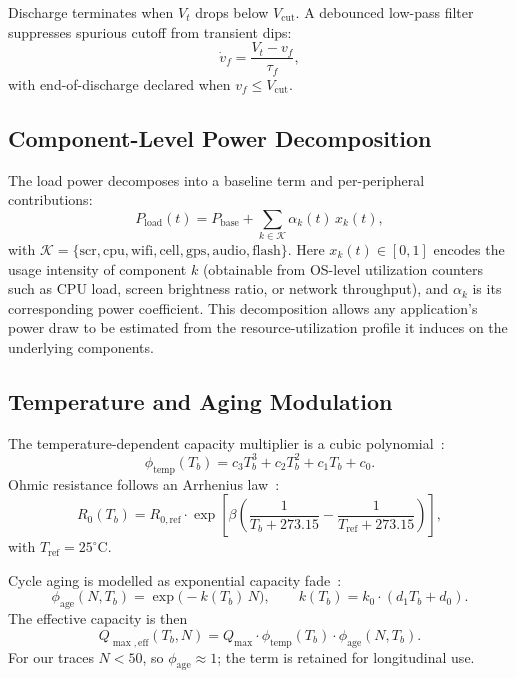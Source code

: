 \documentclass[conference]{IEEEtran}
\begin{document}
Discharge terminates when $V_t$ drops below $V_{\mathrm{cut}}$. A debounced low-pass filter suppresses spurious cutoff from transient dips:
\begin{equation}
    \dot{v}_f = \frac{V_t - v_f}{\tau_f},
    \label{eq:debounce}
\end{equation}
with end-of-discharge declared when $v_f \leq V_{\mathrm{cut}}$.

\subsection{Component-Level Power Decomposition}

The load power decomposes into a baseline term and per-peripheral contributions:
\begin{equation}
    P_{\mathrm{load}}(t) = P_{\mathrm{base}} + \sum_{k \in \mathcal{K}} \alpha_k(t)\,x_k(t),
    \label{eq:pload}
\end{equation}
with $\mathcal{K} = \{\mathrm{scr}, \mathrm{cpu}, \mathrm{wifi}, \mathrm{cell}, \mathrm{gps}, \mathrm{audio}, \mathrm{flash}\}$. Here $x_k(t) \in [0,1]$ encodes the usage intensity of component $k$ (obtainable from OS-level utilization counters such as CPU load, screen brightness ratio, or network throughput), and $\alpha_k$ is its corresponding power coefficient. This decomposition allows any application's power draw to be estimated from the resource-utilization profile it induces on the underlying components.

\subsection{Temperature and Aging Modulation}
\label{subsec:temp_aging}

The temperature-dependent capacity multiplier is a cubic polynomial~\cite{Bernardi_1985}:
\begin{equation}
    \phi_{\mathrm{temp}}(T_b) = c_3 T_b^3 + c_2 T_b^2 + c_1 T_b + c_0.
    \label{eq:phi_temp}
\end{equation}
Ohmic resistance follows an Arrhenius law~\cite{Arrhenius+1889+226+248}:
\begin{equation}
    R_0(T_b) = R_{0,\mathrm{ref}} \cdot \exp\!\left[\beta\left(\frac{1}{T_b + 273.15} - \frac{1}{T_{\mathrm{ref}} + 273.15}\right)\right],
    \label{eq:arrhenius}
\end{equation}
with $T_{\mathrm{ref}} = 25^{\circ}\mathrm{C}$.

Cycle aging is modelled as exponential capacity fade~\cite{Bai_2021}:
\begin{equation}
    \phi_{\mathrm{age}}(N, T_b) = \exp\!\bigl(-k(T_b)\,N\bigr),\qquad
    k(T_b) = k_0 \cdot (d_1 T_b + d_0).
    \label{eq:phi_age}
\end{equation}
The effective capacity is then
\begin{equation}
    Q_{\max,\mathrm{eff}}(T_b, N) = Q_{\max} \cdot \phi_{\mathrm{temp}}(T_b) \cdot \phi_{\mathrm{age}}(N, T_b).
    \label{eq:qmax_eff}
\end{equation}
For our traces $N < 50$, so $\phi_{\mathrm{age}} \approx 1$; the term is retained for longitudinal use.
\end{document}
